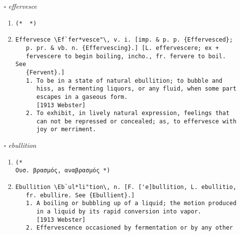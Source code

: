 \documentclass{article}
\begin{document}
\begin{itemize}
\begin{enumerate}
{\begin{lstlisting}
   [1913 Webster]
   1. That which intervenes between one thing and another;
      especially, a space between things closely set, or between
      the parts which compose a body; a narrow chink; a crack; a
      crevice; a hole; an interval; as, the interstices of a
      wall.
      [1913 Webster]
   2. An interval of time; specifically (R. C. Ch.), in the
      plural, the intervals which the canon law requires between
      the reception of the various degrees of orders.
      [1913 Webster]
            Nonobservance of the interstices . . . is a sin.
                                                  --Addis &
                                                  Arnold.
      [1913 Webster]
\end{lstlisting}}
\end{enumerate}
\item[$\square$] \emph{ effervesce }
\begin{enumerate}
\item{
\begin{lstlisting}
(*  *)
\end{lstlisting}}
\item{
\begin{lstlisting}
Effervesce \Ef`fer*vesce"\, v. i. [imp. & p. p. {Effervesced};
   p. pr. & vb. n. {Effervescing}.] [L. effervescere; ex +
   fervescere to begin boiling, incho., fr. fervere to boil. See
   {Fervent}.]
   1. To be in a state of natural ebullition; to bubble and
      hiss, as fermenting liquors, or any fluid, when some part
      escapes in a gaseous form.
      [1913 Webster]
   2. To exhibit, in lively natural expression, feelings that
      can not be repressed or concealed; as, to effervesce with
      joy or merriment.
\end{lstlisting}}
\end{enumerate}
\item[$\square$] \emph{ ebullition }
\begin{enumerate}
\item{
\begin{lstlisting}
(* 
Ουσ. βρασμός, αναβρασμός *)
\end{lstlisting}}
\item{
\begin{lstlisting}
Ebullition \Eb`ul*li"tion\, n. [F. ['e]bullition, L. ebullitio,
   fr. ebullire. See {Ebullient}.]
   1. A boiling or bubbling up of a liquid; the motion produced
      in a liquid by its rapid conversion into vapor.
      [1913 Webster]
   2. Effervescence occasioned by fermentation or by any other

\end{lstlisting}}
\end{enumerate}
\end{itemize}
\end{document}
